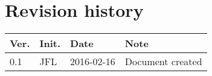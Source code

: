 \chapter*{Revision history}
\label{app:rev_his}

\renewcommand\arraystretch{1.5}
\begin{tabular}{b{1cm} b{1.5cm} b{2cm} b{8cm}}
    \textbf{Ver.} & \textbf{Init.} & \textbf{Date} & \textbf{Note} \\
    \hline
    0.1 & JFL & 2016-02-16 & Document created \\
\end{tabular}
\renewcommand\arraystretch{1}